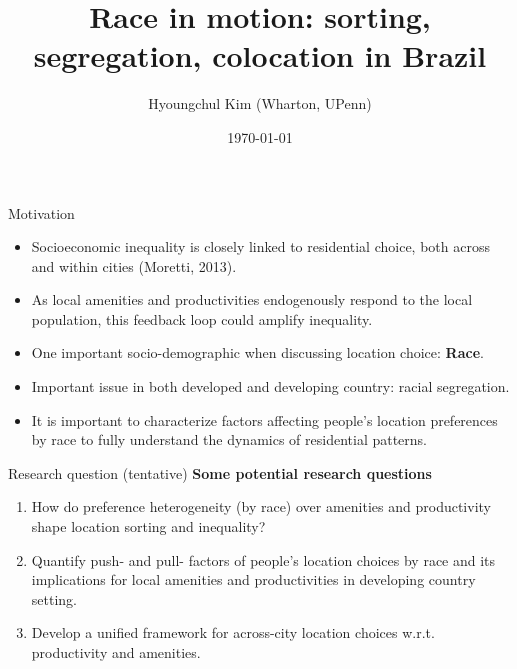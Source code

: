 \documentclass[aspectratio=169]{beamer}
\title{Race in motion: sorting, segregation, colocation in Brazil}
\date{\today}
\author{Hyoungchul Kim (Wharton, UPenn)}
\begin{document}
\maketitle

\begin{frame}{Motivation}

	\begin{itemize}
		\item Socioeconomic inequality is closely linked to residential choice, both across and within cities (Moretti, 2013).
		\item As local amenities and productivities endogenously respond to the local population, this feedback loop could amplify inequality.
		\item One important socio-demographic when discussing location choice: \textbf{Race}.
		\item Important issue in both developed and developing country: racial segregation. 
		\item It is important to characterize factors affecting people's location preferences by race to fully understand the dynamics of residential patterns.
	\end{itemize}


\end{frame}

\begin{frame}{Research question (tentative)}
	\textbf{Some potential research questions}	
	\begin{enumerate}
		\item How do preference heterogeneity (by race) over amenities and productivity shape location sorting and inequality? 
		\item Quantify push- and pull- factors of people's location choices by race and its implications for local amenities and productivities in developing country setting.
		\item Develop a unified framework for across-city location choices w.r.t. productivity and amenities.
	\end{enumerate}
\end{frame}
\end{document}
